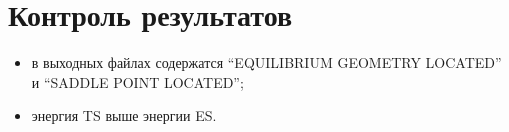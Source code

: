 \section{Контроль результатов}
\begin{itemize}
    \item в выходных файлах содержатся “EQUILIBRIUM GEOMETRY LOCATED” и “SADDLE POINT LOCATED”;
    \item энергия TS выше энергии ES.
\end{itemize}{}
